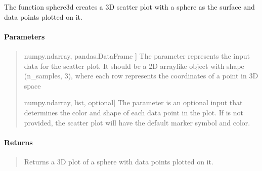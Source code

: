 \documentclass[letterpaper,10pt,english,openany,oneside]{sphinxmanual}
\begin{document}
\begin{fulllineitems}
\label{\detokenize{api_reference/generated/QuadratiK.tools.sphere3d:QuadratiK.tools.sphere3d}}
\pysigstartsignatures
{}
\pysigstopsignatures
\sphinxAtStartPar
The function sphere3d creates a 3D scatter plot with a sphere 
as the surface and data points plotted on it.


\paragraph{Parameters}
\label{\detokenize{api_reference/generated/QuadratiK.tools.sphere3d:parameters}}\begin{quote}
\begin{description}
\sphinxlineitem{x}{[}numpy.ndarray, pandas.DataFrame {]}
\sphinxAtStartPar
The parameter  represents the input data for the scatter plot. 
It should be a 2D array\sphinxhyphen{}like object with shape (n\_samples, 3), 
where each row represents the coordinates of a point in
3D space

\sphinxlineitem{y}{[}numpy.ndarray, list, optional{]}
\sphinxAtStartPar
The parameter  is an optional input that determines the color and 
shape of each data point in the plot. If  is not provided, the 
scatter plot will have the default marker symbol and color.

\end{description}
\end{quote}


\paragraph{Returns}
\label{\detokenize{api_reference/generated/QuadratiK.tools.sphere3d:returns}}\begin{quote}

\sphinxAtStartPar
Returns a 3D plot of a sphere with data points plotted on it.
\end{quote}



\end{fulllineitems}
\end{document}
